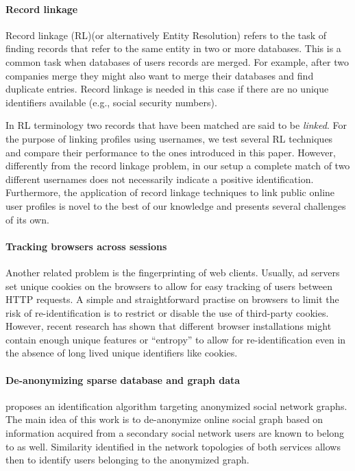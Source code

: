 \documentclass[letterpaper]{sig-alternate}
\begin{document}
\paragraph{Record linkage}

Record linkage (RL)(or alternatively Entity Resolution) \cite{rl, rl_comparison} refers to the task of finding records that refer to the
same entity in two or more databases. This is a common task when databases of users
records are merged. For example, after two companies merge they might also want to
merge their databases and find duplicate entries.
Record linkage is needed in this case if there are no unique identifiers
available (e.g., social security numbers).

In RL terminology two records that have been matched are said to be {\em
linked}. 
For the purpose of linking profiles using usernames, we test several
RL techniques and compare their performance to the ones introduced in this paper.
However, differently from the record linkage problem, in our setup a
complete match of two different usernames does not necessarily indicate a
positive identification. Furthermore, the application of record linkage
techniques to link public online user profiles is novel to the best of our
knowledge and presents several challenges of its own.




\paragraph{Tracking browsers across sessions}

Another related problem is the fingerprinting of web clients. Usually, ad servers set unique cookies on the browsers to allow for easy
tracking of users between HTTP requests.  A simple and straightforward practise
on browsers to limit the risk of re-identification is to restrict or disable
the use of third-party cookies. However, recent research \cite{EFF} has shown
that different browser installations might contain enough unique features or
``entropy'' to allow for re-identification even in the absence of long lived
unique identifiers like cookies.

\paragraph{De-anonymizing sparse database and graph data}

\cite{deanonymizingSP09} proposes an identification algorithm targeting
anonymized social network graphs. The main idea of this work is to de-anonymize
online social graph based on information acquired from a secondary social
network users are known to belong to as well. Similarity identified in the
network topologies of both services allows then to identify users belonging to
the anonymized graph.  
 
\end{document}

